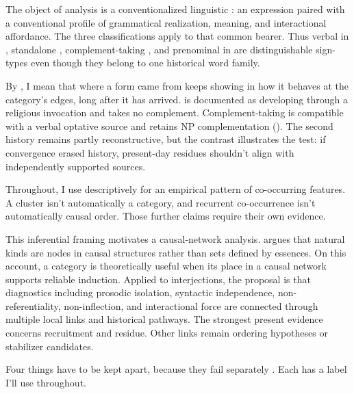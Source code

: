\documentclass[12pt]{article}
\begin{document}
The object of analysis is a conventionalized linguistic
: an expression paired with a conventional profile of
grammatical realization, meaning, and interactional affordance. The three
classifications apply to that common bearer. Thus verbal  in
, standalone , complement-taking
, and prenominal  in
 are distinguishable sign-types even though they belong
to one historical word family.

By , I mean that where a form came from keeps
showing in how it behaves at the category's edges, long after it has
arrived.  is documented as developing through a religious
invocation and takes no complement. Complement-taking  is
compatible with a verbal optative source and retains NP complementation
(). The second history remains partly
reconstructive, but the contrast illustrates the test: if convergence erased
history, present-day residues shouldn't align with independently supported
sources.

Throughout, I use  descriptively for an empirical
pattern of co-occurring features. A cluster isn't automatically a category,
and recurrent co-occurrence isn't automatically causal order. Those further
claims require their own evidence.

This inferential framing motivates a causal-network analysis.
\textcite{khalidi2013,khalidi2018nodes} argues that natural kinds are
nodes in causal structures rather than sets defined by essences. On
this account, a category is theoretically useful when its place in a
causal network supports reliable induction. Applied to interjections,
the proposal is that diagnostics including prosodic isolation, syntactic
independence, non-referentiality, non-inflection, and interactional force are
connected through multiple local links and historical pathways. The strongest
present evidence concerns recruitment and residue. Other links remain
ordering hypotheses or stabilizer candidates.

Four things have to be kept apart, because they fail
separately \citep[adapted from][11--12]{reynolds2026projectibilityHistory}. Each
has a label I'll use throughout.
\end{document}
